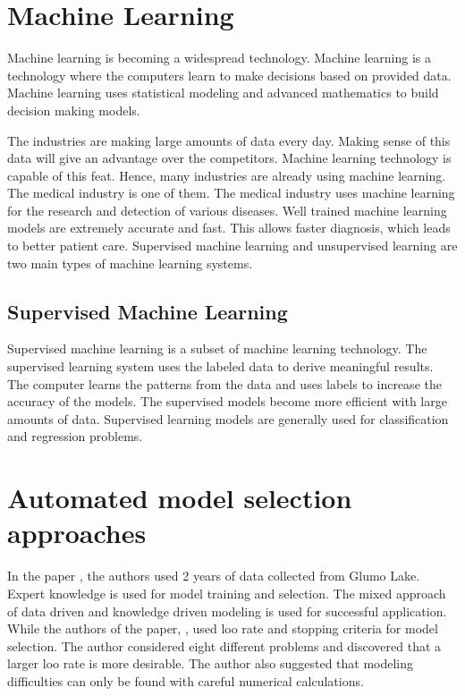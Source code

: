 \section{Machine Learning}\label{sec:machine_learning}

Machine learning is becoming a widespread technology. Machine learning is a technology where the computers learn to make decisions based on provided data. Machine learning uses statistical modeling and advanced mathematics to build decision making models.

The industries are making large amounts of data every day. Making sense of this data will give an advantage over the competitors. Machine learning technology is capable of this feat. Hence, many industries are already using machine learning. The medical industry is one of them. The medical industry uses machine learning for the research and detection of various diseases. Well trained machine learning models are extremely accurate and fast. This allows faster diagnosis, which leads to better patient care. Supervised machine learning and unsupervised learning are two main types of machine learning systems.

\subsection{Supervised Machine Learning}\label{subsec:supervised_machine_learning}

Supervised machine learning is a subset of machine learning technology. The supervised learning system uses the labeled data to derive meaningful results. The computer learns the patterns from the data and uses labels to increase the accuracy of the models. The supervised models become more efficient with large amounts of data. Supervised learning models are generally used for classification and regression problems.

\section{Automated model selection approaches} \label{sec:automated_model_selection_approaches}

In the paper \cite{ref_paper_43}, the authors used 2 years of data collected from Glumo Lake. Expert knowledge is used for model training and selection. The mixed approach of data driven and knowledge driven modeling is used for successful application. While the authors of the paper, \cite{ref_paper_2}, used loo rate and stopping criteria for model selection. The author considered eight different problems and discovered that a larger loo rate is more desirable. The author also suggested that modeling difficulties can only be found with careful numerical calculations.

